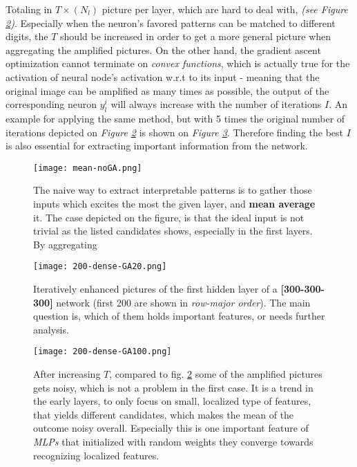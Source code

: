 Totaling in $T\times(N_l)$ picture per layer, which are hard to deal with, \emph{(see Figure \ref{fig:dense})}. 
Especially when the neuron's favored patterns can be matched to different digits, 
the $T$ should be increased in order to get a more general picture when aggregating the amplified pictures.
On the other hand, the gradient ascent optimization cannot terminate on \emph{convex functions}, which is actually true for the activation of neural node's activation w.r.t to its input - meaning that the original image can be amplified as many times as possible, the output of the corresponding neuron $y_l^i$ will always increase with the number of iterations $I$. An example for applying the same method, but with 5 times the original number of iterations depicted on \emph{Figure \ref{fig:dense}} is shown on \emph{Figure \ref{fig:dense-100}}.
Therefore finding the best $I$ is also essential for extracting important information from the network.


\begin{figure}
    \centering
    \texttt{[image: mean-noGA.png]}
    \caption{The naive way to extract interpretable patterns is to gather those inputs which excites the most the given layer, and \textbf{mean average} it. The case depicted on the figure, is that the ideal input is not trivial as the listed candidates shows, especially in the first layers. By aggregating}
    \label{fig:mean}
\end{figure}


\begin{figure}
    \centering
    \texttt{[image: 200-dense-GA20.png]}
    \caption{Iteratively enhanced pictures of the first hidden layer of a \textbf{[300-300-300]} network (first 200 are shown in \emph{row-major order}). The main question is, which of them holds important features, or needs further analysis.}
    \label{fig:dense}
\end{figure}


\begin{figure}
    \centering
    \texttt{[image: 200-dense-GA100.png]}
    \caption{After increasing $T$, compared to fig. \ref{fig:dense} some of the amplified pictures gets noisy, which is not a problem in the first case. It is a trend in the early layers, to only focus on small, localized type of features, that yields different candidates, which makes the mean of the outcome noisy overall. Especially this is one important feature of \emph{MLPs} that initialized with random weights they converge towards recognizing localized features.}
    \label{fig:dense-100}
\end{figure}


